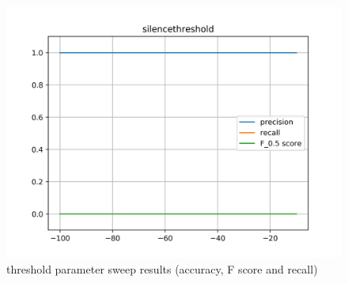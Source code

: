 \begin{figure}[!ht]
	\includegraphics[clip,width=\columnwidth]{Figures/silencethreshold.png}%
	\caption{threshold parameter sweep results (accuracy, F score and recall)}
	\label{fig:accomp}
\end{figure}

\newpage


